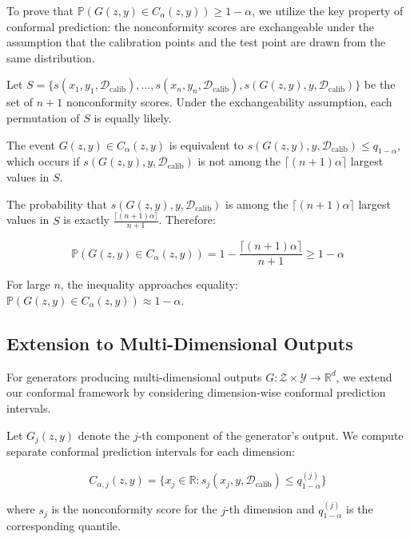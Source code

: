 \documentclass{article}
\theoremstyle{plain}
\theoremstyle{definition}
\theoremstyle{remark}
\begin{document}
To prove that $\mathbb{P}(G(z, y) \in C_{\alpha}(z, y)) \geq 1 - \alpha$, we utilize the key property of conformal prediction: the nonconformity scores are exchangeable under the assumption that the calibration points and the test point are drawn from the same distribution.

Let $S = \{s(x_1, y_1, \mathcal{D}_{\text{calib}}), \ldots, s(x_n, y_n, \mathcal{D}_{\text{calib}}), s(G(z, y), y, \mathcal{D}_{\text{calib}})\}$ be the set of $n+1$ nonconformity scores. Under the exchangeability assumption, each permutation of $S$ is equally likely.

The event $G(z, y) \in C_{\alpha}(z, y)$ is equivalent to $s(G(z, y), y, \mathcal{D}_{\text{calib}}) \leq q_{1-\alpha}$, which occurs if $s(G(z, y), y, \mathcal{D}_{\text{calib}})$ is not among the $\lceil (n+1) \alpha \rceil$ largest values in $S$.

The probability that $s(G(z, y), y, \mathcal{D}_{\text{calib}})$ is among the $\lceil (n+1) \alpha \rceil$ largest values in $S$ is exactly $\frac{\lceil (n+1) \alpha \rceil}{n+1}$. Therefore:

\begin{equation}
\mathbb{P}(G(z, y) \in C_{\alpha}(z, y)) = 1 - \frac{\lceil (n+1) \alpha \rceil}{n+1} \geq 1 - \alpha
\end{equation}

For large $n$, the inequality approaches equality: $\mathbb{P}(G(z, y) \in C_{\alpha}(z, y)) \approx 1 - \alpha$.

\subsection{Extension to Multi-Dimensional Outputs}

For generators producing multi-dimensional outputs $G: \mathcal{Z} \times \mathcal{Y} \rightarrow \mathbb{R}^d$, we extend our conformal framework by considering dimension-wise conformal prediction intervals.

Let $G_j(z, y)$ denote the $j$-th component of the generator's output. We compute separate conformal prediction intervals for each dimension:

\begin{equation}
C_{\alpha,j}(z, y) = \{x_j \in \mathbb{R}: s_j(x_j, y, \mathcal{D}_{\text{calib}}) \leq q_{1-\alpha}^{(j)}\}
\end{equation}

where $s_j$ is the nonconformity score for the $j$-th dimension and $q_{1-\alpha}^{(j)}$ is the corresponding quantile.
\end{document}
